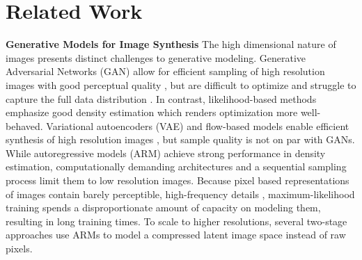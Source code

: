 \documentclass[10pt,twocolumn,letterpaper]{article}
\begin{document}
\section{Related Work}
\enlargethispage{\baselineskip}
\vspace{-0.75em}
\textbf{Generative Models for Image Synthesis}
The high dimensional nature of images presents distinct challenges to generative modeling.
Generative Adversarial Networks (GAN) \cite{goodfellow2014GAN}
allow for efficient sampling of high resolution images with good perceptual quality \cite{bigganbrock, DBLP:journals/corr/abs-1912-04958}, but are difficult to optimize \cite{DBLP:journals/corr/abs-1801-04406,arjovsky2017wasserstein, gulrajani2017improved} and struggle to capture the full data distribution 
\cite{DBLP:conf/iclr/MetzPPS17}. 
%
In contrast, likelihood-based methods emphasize good density estimation which renders optimization more well-behaved.
Variational autoencoders (VAE) \cite{VAE}
and flow-based models \cite{dinh2015nice, DBLP:conf/iclr/DinhSB17} enable efficient synthesis of high resolution images \cite{DBLP:journals/corr/abs-2011-10650, DBLP:conf/nips/VahdatK20, glow}, but sample quality is not on par with GANs.
While autoregressive models (ARM) \cite{DBLP:journals/corr/OordKK16,
NIPS2016_b1301141, DBLP:conf/icml/ChenRC0JLS20,
DBLP:journals/corr/abs-1904-10509} achieve strong performance in density
estimation, computationally demanding architectures
\cite{DBLP:conf/nips/VaswaniSPUJGKP17} and a sequential sampling process limit them to low resolution images.
Because pixel based representations of images contain barely
perceptible, high-frequency details \cite{dieleman2020typicality,
DBLP:journals/corr/SalimansKCK17}, maximum-likelihood training spends a
disproportionate amount of capacity on modeling them, resulting in
long training times.
To scale to higher resolutions,
several two-stage approaches \cite{DBLP:journals/corr/abs-2104-10157, DBLP:conf/nips/RazaviOV19, DBLP:journals/corr/abs-2012-09841, yu2021vectorquantized}
use ARMs to model a compressed latent image space instead of raw pixels.
\end{document}
